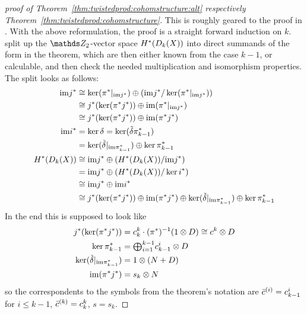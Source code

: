 \begin{proof}[proof of
  Theorem~\ref{thm:twistedprod:cohomstructure:alt}
  respectively Theorem~\ref{thm:twistedprod:cohomstructure}]
  This is roughly geared to the proof in \cite[Theorem~7.1]{brown}.
  With the above reformulation, the proof is a straight forward
  induction on $k$.
  \Idest split up the $\Zmod2$-vector space $H^*(D_{k}({X}))$
  into direct summands of the form in the theorem, which are then
  either known from the case $k-1$, or calculable, and then check the
  needed multiplication and isomorphism properties.
  The split looks as follows:
  \begin{align*}
    \mathrm{im}{j}^*
    &\cong \ker({\pi}^*|_{\mathrm{im}{j}^*})
      \oplus \left(\mathrm{im}{j}^*/\ker({\pi}^*|_{\mathrm{im}{j}^*})\right) \\
    &\cong {j}^*(\ker({\pi}^*{j}^*))
      \oplus \mathrm{im}({\pi}^*|_{\mathrm{im}{j}^*}) \\
    &\cong {j}^*(\ker({\pi}^*{j}^*))
      \oplus \mathrm{im}({\pi}^*{j}^*) \\
    \mathrm{im}{i}^*
    &= \ker\delta = \ker(\tilde\delta{\pi}^*_{k-1})\\
    &= \ker(\tilde\delta|_{\mathrm{im}{\pi}^*_{k-1}})
      \oplus \ker{\pi}^*_{k-1} \\
    H^*(D_{k}({X}))
    &\cong \mathrm{im}{j}^*
      \oplus \left( H^*(D_{k}({X}))/\mathrm{im}{j}^* \right)\\
    &= \mathrm{im}{j}^*
      \oplus \left( H^*(D_{k}({X}))/\ker{i}^* \right)\\
    &\cong \mathrm{im}{j}^* \oplus \mathrm{im}{i}^*\\
    &\cong {j}^*(\ker({\pi}^*{j}^*))
      \oplus \mathrm{im}({\pi}^*{j}^*)
      \oplus \ker(\tilde\delta|_{\mathrm{im}{\pi}^*_{k-1}})
      \oplus \ker{\pi}^*_{k-1}
  \end{align*}
  In the end this is supposed to look like
  \begin{align*}
    {j}^*(\ker({\pi}^*{j}^*))
    &= c_k^k\cdot({\pi}^*)^{-1}(1\otimes D)\cong c^k\otimes D
    \\
    \ker{\pi}^*_{k-1}
    &= {\textstyle\bigoplus_{i=1}^{k-1}} c_{k-1}^i\otimes D
    \\
    \ker(\tilde\delta|_{\mathrm{im}{\pi}^*_{k-1}})
    &= 1\otimes(N+D)
    \\
    \mathrm{im}({\pi}^*{j}^*) &= s_k\otimes N
  \end{align*}
  so the correspondents to the symbols from the theorem's notation are
  $\bar c^{(i)} = c_{k-1}^i$ for $i\leq k-1$, $\bar c^{(k)} = c_k^k$, $s=s_k$.


\end{proof}
